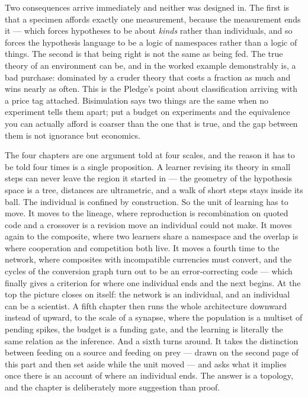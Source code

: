 \documentclass[12pt,openright,twoside]{book}
\theoremstyle{remark}
\theoremstyle{plain}
\theoremstyle{remark}
\theoremstyle{plain}
\theoremstyle{plain}
\begin{document}
Two consequences arrive immediately and neither was designed in.
The first is that a specimen affords exactly one measurement, because the
measurement ends it --- which forces hypotheses to be about \emph{kinds}
rather than individuals, and so forces the hypothesis language to be a
logic of namespaces rather than a logic of things.
The second is that being right is not the same as being fed.
The true theory of an environment can be, and in the worked example
demonstrably is, a bad purchase: dominated by a cruder theory that costs a
fraction as much and wins nearly as often.
This is the Pledge's point about classification arriving with a price tag
attached.
Bisimulation says two things are the same when no experiment tells them
apart; put a budget on experiments and the equivalence you can actually
afford is coarser than the one that is true, and the gap between them is
not ignorance but economics.

The four chapters are one argument told at four scales, and the reason it
has to be told four times is a single proposition.
A learner revising its theory in small steps can never leave the region it
started in --- the geometry of the hypothesis space is a tree, distances are
ultrametric, and a walk of short steps stays inside its ball.
The individual is confined by construction.
So the unit of learning has to move.
It moves to the lineage, where reproduction is recombination on quoted code
and a crossover is a revision move an individual could not make.
It moves again to the composite, where two learners share a namespace and
the overlap is where cooperation and competition both live.
It moves a fourth time to the network, where composites with incompatible
currencies must convert, and the cycles of the conversion graph turn out to
be an error-correcting code --- which finally gives a criterion for where one
individual ends and the next begins.
At the top the picture closes on itself: the network is an individual, and
an individual can be a scientist.
A fifth chapter then runs the whole architecture downward instead of
upward, to the scale of a synapse, where the population is a multiset of
pending spikes, the budget is a funding gate, and the learning is
literally the same relation as the inference.
And a sixth turns around. It takes the distinction between feeding on a
source and feeding on prey --- drawn on the second page of this part and
then set aside while the unit moved --- and asks what it implies once
there is an account of where an individual ends. The answer is a
topology, and the chapter is deliberately more suggestion than proof.
\end{document}
